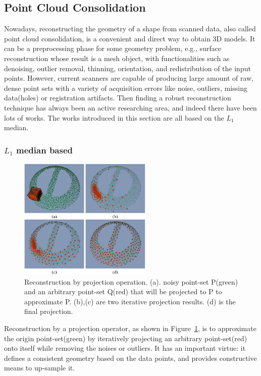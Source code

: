\subsection{Point Cloud Consolidation}
\label{subsec:Point Cloud Consolidation}


Nowadays, reconstructing the geometry of a shape from scanned data, also called point cloud consolidation, is a convenient and direct way to obtain 3D models.
It can be a preprocessing phase for some geometry problem, e.g., surface reconstruction whose result is a mesh object, with functionalities such as denoising, outlier removal, thinning, orientation, and redistribution of the input points.
However, current scanners are capable of producing large amount of raw, dense point sets with a variety of acquisition errors like noise, outliers, missing data(holes) or registration artifacts.
Then finding a robust reconstruction technique has always been an active researching area, and indeed there have been lots of works.
The works introduced in this section are all based on the $L_1$ median.

\subsubsection{$L_1$ median based}
\label{subsubsec:$L_1$ median based}

\begin{figure}[ht]
  \centering
  \includegraphics[width=2.5in]{images/L1median}
  \caption{Reconstruction by projection operation. (a). noisy point-set P(green) and an arbitrary point-set Q(red) that will be projected to P to approximate P. (b),(c) are two iterative projection results. (d) is the final projection.}
  \label{fig:L1 median}
\end{figure}

Reconstruction by a projection operator, as shown in Figure~\ref{fig:L1 median}, is to approximate the origin point-set(green) by iteratively projecting an arbitrary point-set(red) onto itself while removing the noises or outliers.
It has an important virtue: it defines a consistent geometry based on the data points, and provides constructive means to up-sample it.

